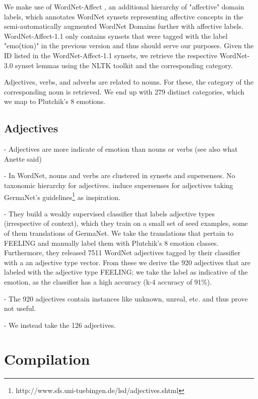 We make use of WordNet-Affect \cite{wordnet-affect}, an additional hierarchy of "affective" domain labels, which annotates WordNet synsets representing affective concepts in the semi-automatically augmented WordNet Domains further with affective labels. WordNet-Affect-1.1 only contains synsets that were tagged with the label "emo(tion)" in the previous version and thus should serve our purposes. Given the ID listed in the WordNet-Affect-1.1 synsets, we retrieve the respective WordNet-3.0 synset lemmas using the NLTK toolkit\cite{nltk} and the corresponding category.

Adjectives, verbs, and adverbs are related to nouns. For these, the category of the corresponding noun is retrieved. We end up with 279 distinct categories, which we map to Plutchik's 8 emotions.


\subsection{Adjectives}

- Adjectives are more indicate of emotion than nouns or verbs (see also what Anette said)

- In WordNet, nouns and verbs are clustered in synsets and supersenses. No taxonomic hierarchy for adjectives. \cite{adjective_supersenses} induce supersenses for adjectives taking GermaNet's guidelines\footnote{http://www.sfs.uni-tuebingen.de/lsd/adjectives.shtml} as inspiration.

- They build a weakly supervised classifier that labels adjective types (irrespective of context), which they train on a small set of seed examples, some of them translations of GermaNet. We take the translations that pertain to FEELING and manually label them with Plutchik's 8 emotion classes. Furthermore, they released 7511 WordNet adjectives tagged by their classifier with a an adjective type vector. From these we derive the 920 adjectives that are labeled with the adjective type FEELING; we take the label as indicative of the emotion, as the classifier has a high accuracy (k-4 accuracy of 91\%).

- The 920 adjectives contain instances like unknown, unreal, etc. and thus prove not useful.

- We instead take the 126 adjectives. 


\section{Compilation}

